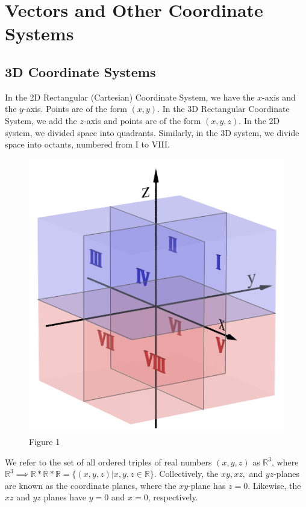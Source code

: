\section{Vectors and Other Coordinate Systems}

    \subsection{3D Coordinate Systems}
        In the 2D Rectangular (Cartesian) Coordinate System, we have the $x$-axis and the
        $y$-axis. Points are of the form $(x,y)$. In the 3D Rectangular Coordinate System,
        we add the $z$-axis and points are of the form $(x,y,z)$. In the 2D system, we divided
        space into quadrants. Similarly, in the 3D system, we divide space into octants, numbered
        from I to VIII.

        \begin{figure} [hbt!]
            \centering
            \includegraphics[scale=0.3]{Resources/Unit3Vectors/Octants.png}
            \caption*{Figure 1}
        \end{figure}

        \noindent We refer to the set of all ordered triples of real numbers $(x,y,z)$ as
        $\mathbb{R}^3$, where
        $\mathbb{R}^3\implies\mathbb{R}*\mathbb{R}*\mathbb{R}=\{(x,y,z)|x,y,z\in\mathbb{R}\}$.
        Collectively, the $xy, xz,$ and $yz$-planes are known as the coordinate planes, where
        the $xy$-plane has $z=0$. Likewise, the $xz$ and $yz$ planes have $y=0$ and $x = 0$,
        respectively. \\

